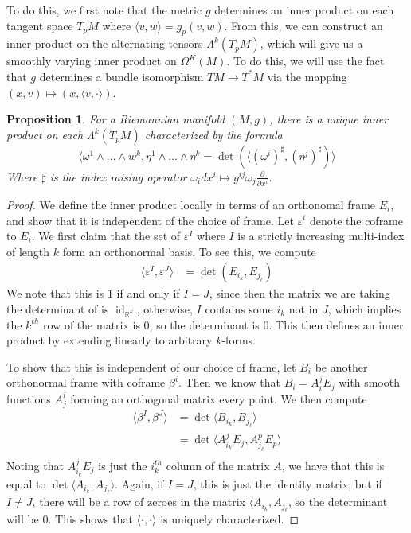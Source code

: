 \documentclass[psamsfonts]{amsart}
\newtheorem{prop}[thm]{Proposition}
\theoremstyle{definition}
\theoremstyle{remark}
\newcommand{\R}{\mathbb{R}}
\DeclareMathOperator{\id}{id}
\begin{document}
To do this, we first note that the metric $g$ determines an inner product on each tangent space $T_pM$ where $\langle v, w \rangle = g_p(v,w)$. From this, we can construct an inner product on the alternating tensors $\Lambda^k(T_pM)$, which will give us a smoothly varying inner product on $\Omega^K(M)$. To  do this, we will use the fact that $g$ determines a bundle isomorphism $TM \to  T^*M$ via the mapping $(x,v) \mapsto (x, \langle v, \cdot \rangle )$.
%
\begin{prop}
For a Riemannian manifold $(M,g)$,  there is a unique inner product on each $\Lambda^k(T_pM)$ characterized by the formula
$$\langle \omega^1 \wedge \ldots \wedge w^k, \eta^1 \wedge \ldots \wedge \eta^k = \det\left( \langle (\omega^i)^\sharp, (\eta^j)^\sharp \right) \rangle $$
Where $\sharp$ is the index raising operator $\omega_i dx^i \mapsto g^{ij}\omega_j\frac{\partial}{\partial x^i}$.
\end{prop}
%
\begin{proof}
We define the inner product locally in terms of an orthonomal frame $E_i$, and show that it is independent of the choice of frame. Let $\varepsilon^i$  denote the coframe to  $E_i$. We first claim that the set of $\varepsilon^I$ where $I$  is a strictly increasing multi-index of length $k$ form an orthonormal basis. To see this, we compute 
\begin{align*}
\langle \varepsilon^I, \varepsilon^J \rangle &= \det\left( E_{i_k}, E_{j_\ell} \right) 
\end{align*}
We note that this is $1$ if and only if $I = J$, since then the matrix we are taking the determinant of is $\id_{\R^k}$, otherwise, $I$  contains some $i_k$ not in  $J$, which implies the $k^{th}$ row of the matrix is $0$, so the determinant is $0$. This then defines an inner product by extending linearly to arbitrary $k$-forms.

To show that this is independent of our choice of frame, let  $B_i$ be another orthonormal frame with coframe $\beta^i$. Then we know that $B_i = A^j_iE_j$ with smooth functions $A^i_j$ forming an orthogonal matrix every point. We then compute
\begin{align*}
\langle \beta^I, \beta^J \rangle &= \det \langle B_{i_k}, B_{j_\ell} \rangle \\
&= \det\langle A^j_{i_k}E_j, A^p_{j_\ell}E_p \rangle \\
\end{align*}
Noting that $A^j_{i_k}E_j$ is just the $i_k^{th}$ column of the matrix $A$, we have that this is equal to $\det \langle A_{i_k}, A_{j_\ell} \rangle$. Again, if $I = J$, this is just the identity matrix, but if $I \neq J$, there will be a row of zeroes in the matrix $\langle A_{i_k}, A_{j_\ell}$, so the determinant will be $0$. This shows that $\langle \cdot, \cdot \rangle$  is uniquely characterized. 
\end{proof}
\end{document}
